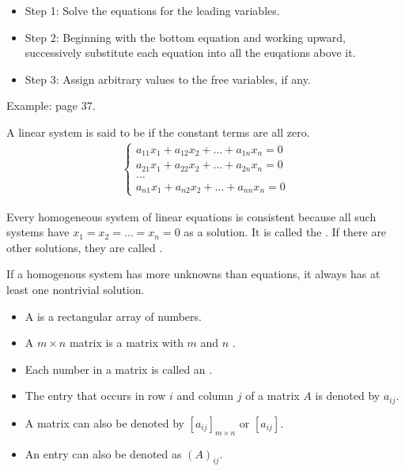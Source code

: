     \begin{itemize}
      \item Step 1: Solve the equations for the leading variables.
      \item Step 2: Beginning with the bottom equation and working upward,
      successively substitute each equation into all the euqations above it.
      \item Step 3: Assign arbitrary values to the free variables, if any.
    \end{itemize}
    \par Example: page 37.
  
    \par A linear system is said to be  if the constant
      terms are all zero.
    \begin{align*}
      \begin{cases}
        a_{11}x_{1} + a_{12}x_{2} + \ldots + a_{1n}x_{n} = 0 \\
        a_{21}x_{1} + a_{22}x_{2} + \ldots + a_{2n}x_{n} = 0 \\
        \ldots \\
        a_{n1}x_{1} + a_{n2}x_{2} + \ldots + a_{nn}x_{n} = 0
      \end{cases}
    \end{align*}
    \par Every homogeneous system of linear equations is consistent because
      all such systems have $x_{1} = x_{2} = \ldots = x_{n} = 0$ as a solution.
      It is called the . If there are other solutions,
      they are called .
    \par If a homogenous system has more unknowns than equations, it always
      has at least one nontrivial solution.
      



      \begin{itemize}
        \item A  is a rectangular array of numbers.
        \item A $m \times n$ matrix is a matrix with $m$ 
          and $n$ .
        \item Each number in a matrix is called an .
        \item The entry that occurs in row $i$ and column $j$ of a matrix $A$
          is denoted by $a_{ij}$.
        \item A matrix can also be denoted by $[a_{ij}]_{m \times n}$ or
          $[a_{ij}]$.
        \item An entry can also be denoted as $(A)_{ij}$.
      \end{itemize}

